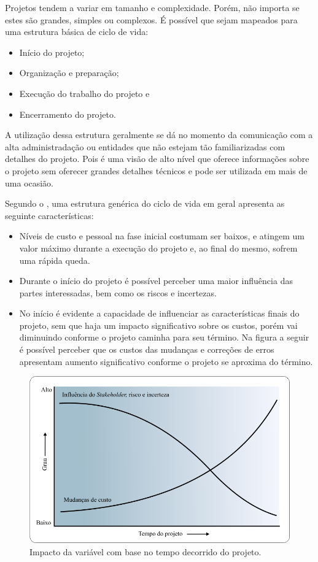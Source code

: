 \documentclass[12pt,a4paper,ruledheader,tocpage=prefix,floatnumber=continuous,pagestart=folhaderosto,font=times]{abnt}
\begin{document}
Projetos tendem a variar em tamanho e complexidade. Porém, não importa se estes são grandes, simples ou complexos. É possível que sejam mapeados para uma
estrutura básica de ciclo de vida\cite{PMBOK2008}:

\begin{itemize}
 \item Início do projeto;
 \item Organização e preparação;
 \item Execução do trabalho do projeto e
 \item Encerramento do projeto.
\end{itemize}

A utilização dessa estrutura geralmente se dá no momento da comunicação com a alta administradação ou entidades que não estejam tão familiarizadas com detalhes
do projeto. Pois é uma visão de alto nível que oferece informações sobre o projeto sem oferecer grandes detalhes técnicos e pode ser utilizada em mais de uma
ocasião.

Segundo o , uma estrutura genérica do ciclo de vida em geral apresenta as seguinte características:

\begin{itemize}
 \item Níveis de custo e pessoal na fase inicial costumam ser baixos, e atingem um valor máximo durante a execução do projeto e, ao final do mesmo, sofrem
       uma rápida queda.
 \item Durante o início do projeto é possível perceber uma maior influência das partes interessadas, bem como os riscos e incertezas.
 \item No início é evidente a capacidade de influenciar as características finais do projeto, sem que haja um impacto significativo sobre os custos, porém
       vai diminuindo conforme o projeto caminha para seu término. Na figura a seguir é possível perceber que os custos das mudanças e correções de erros
       apresentam aumento significativo conforme o projeto se aproxima do término.
\end{itemize}

\begin{figure}[H]
\centering
\includegraphics[width=.7\textwidth]{img/fig1.png}
\caption{Impacto da variável com base no tempo decorrido do projeto\cite{PMBOK2008}.}
\end{figure}
\end{document}
